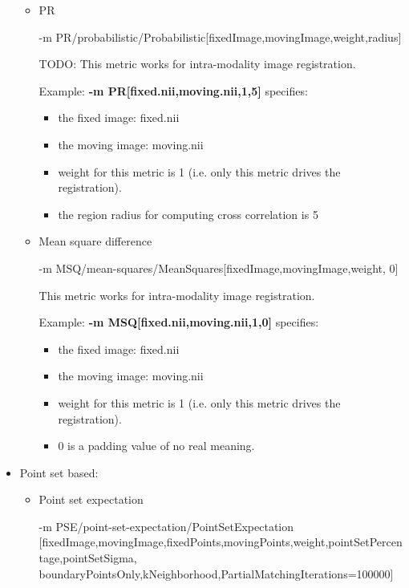 \begin{itemize}
\begin{itemize}
        \item PR

        -m PR/probabilistic/Probabilistic[fixedImage,movingImage,weight,radius]
        
        TODO: This metric works for intra-modality image registration.
        
        Example: \textbf{-m PR[fixed.nii,moving.nii,1,5]} specifies:
            \begin{itemize}
             \item the fixed image: fixed.nii
             \item the moving image: moving.nii             
             \item weight for this metric is 1 (i.e. only this metric drives the registration).      \item the region radius for computing cross correlation is 5
            \end{itemize}

        \item Mean square difference

        -m MSQ/mean-squares/MeanSquares[fixedImage,movingImage,weight, 0]
        
        This metric works for intra-modality image registration.
        
        Example: \textbf{-m MSQ[fixed.nii,moving.nii,1,0]} specifies:
            \begin{itemize}
             \item the fixed image: fixed.nii
             \item the moving image: moving.nii             
             \item weight for this metric is 1 (i.e. only this metric drives the registration).      \item 0 is a padding value of no real meaning.
            \end{itemize}

    \end{itemize}

 \item Point set based:
    \begin{itemize}
        \item Point set expectation

        -m PSE/point-set-expectation/PointSetExpectation [fixedImage,movingImage,fixedPoints,movingPoints,weight,pointSetPercentage,pointSetSigma, boundaryPointsOnly,kNeighborhood,PartialMatchingIterations=100000]


\end{itemize}
\end{itemize}

